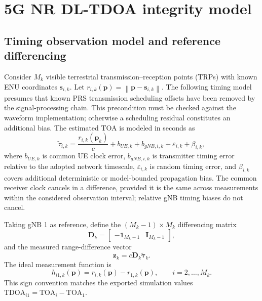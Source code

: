 \documentclass[pdflatex,sn-mathphys-num]{sn-jnl}
\newcommand{\vect}[1]{\boldsymbol{#1}}
\newcommand{\mat}[1]{\mathbf{#1}}
\newcommand{\norm}[1]{\left\lVert #1\right\rVert}
\begin{document}
\section{5G NR DL-TDOA integrity model}\label{sec:5g}

\subsection{Timing observation model and reference differencing}

Consider $M_k$ visible terrestrial transmission--reception points (TRPs)
with known ENU coordinates $\vect{s}_{i,k}$. Let
$r_{i,k}(\vect{p})=\norm{\vect{p}-\vect{s}_{i,k}}$.
The following timing model presumes that known PRS transmission
scheduling offsets have been removed by the signal-processing chain.
This precondition must be checked against the waveform implementation;
otherwise a scheduling residual constitutes an additional bias.
The estimated TOA is modeled in seconds as
\begin{equation}\label{eq:toa5g}
 \tilde\tau_{i,k}=\frac{r_{i,k}(\vect{p}_k)}{c}
 +b_{UE,k}+b_{gNB,i,k}+\varepsilon_{i,k}+\beta_{i,k},
\end{equation}
where $b_{UE,k}$ is common UE clock error, $b_{gNB,i,k}$ is transmitter
timing error relative to the adopted network timescale,
$\varepsilon_{i,k}$ is random timing error, and $\beta_{i,k}$ covers
additional deterministic or model-bounded propagation bias. The common
receiver clock cancels in a difference, provided it is the same across
measurements within the considered observation interval; relative
gNB timing biases do not cancel.

Taking gNB 1 as reference, define the $(M_k-1)\times M_k$ differencing matrix
\begin{equation}\label{eq:D}
 \mat{D}_k=\begin{bmatrix}-\vect{1}_{M_k-1}&\mat{I}_{M_k-1}\end{bmatrix},
\end{equation}
and the measured range-difference vector
\begin{equation}\label{eq:ztdoa}
 \vect{z}_k=c\mat{D}_k\tilde{\vect{\tau}}_k.
\end{equation}
The ideal measurement function is
\begin{equation}\label{eq:htdoa}
 h_{i1,k}(\vect{p})=r_{i,k}(\vect{p})-r_{1,k}(\vect{p}),
 \qquad i=2,\ldots,M_k.
\end{equation}
This sign convention matches the exported simulation values
$\mathrm{TDOA}_{i1}=\mathrm{TOA}_i-\mathrm{TOA}_1$.
\end{document}
